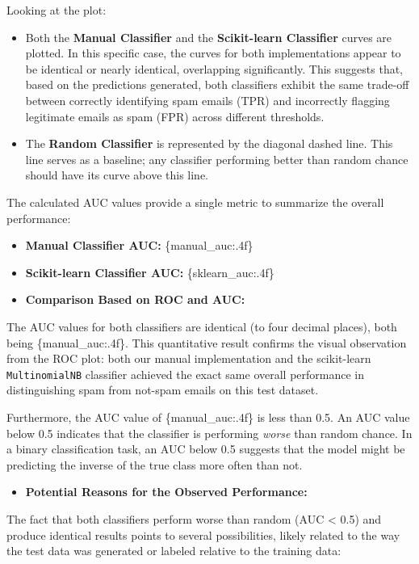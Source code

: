 \documentclass[12pt,a4paper]{article}
\begin{document}
Looking at the plot:

\begin{itemize}
    \item Both the \textbf{Manual Classifier} and the \textbf{Scikit-learn Classifier} curves are plotted. In this specific case, the curves for both implementations appear to be identical or nearly identical, overlapping significantly. This suggests that, based on the predictions generated, both classifiers exhibit the same trade-off between correctly identifying spam emails (TPR) and incorrectly flagging legitimate emails as spam (FPR) across different thresholds.
    \item The \textbf{Random Classifier} is represented by the diagonal dashed line. This line serves as a baseline; any classifier performing better than random chance should have its curve above this line.
\end{itemize}

The calculated AUC values provide a single metric to summarize the overall performance:

\begin{itemize}
    \item \textbf{Manual Classifier AUC:} \{manual\_auc:.4f\}
    \item \textbf{Scikit-learn Classifier AUC:} \{sklearn\_auc:.4f\}
    \item \textbf{Comparison Based on ROC and AUC:}
\end{itemize}

The AUC values for both classifiers are identical (to four decimal places), both being \{manual\_auc:.4f\}. This quantitative result confirms the visual observation from the ROC plot: both our manual implementation and the scikit-learn \texttt{MultinomialNB} classifier achieved the exact same overall performance in distinguishing spam from not-spam emails on this test dataset.

Furthermore, the AUC value of \{manual\_auc:.4f\} is less than 0.5. An AUC value below 0.5 indicates that the classifier is performing \textit{worse} than random chance. In a binary classification task, an AUC below 0.5 suggests that the model might be predicting the inverse of the true class more often than not.

\begin{itemize}
    \item \textbf{Potential Reasons for the Observed Performance:}
\end{itemize}

The fact that both classifiers perform worse than random (AUC < 0.5) and produce identical results points to several possibilities, likely related to the way the test data was generated or labeled relative to the training data:
\end{document}
